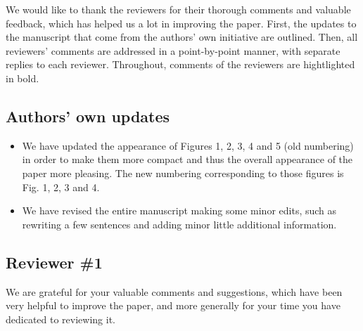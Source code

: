 \documentclass[11pt]{report}
\begin{document}
We would like to thank the reviewers for their thorough comments and valuable feedback, which has helped us a lot in improving the paper. First, the updates to the manuscript that come from the authors' own initiative are outlined. Then, all reviewers' comments are addressed in a point-by-point manner, with separate replies to each reviewer. 
Throughout, comments of the reviewers are hightlighted in bold.

\noindent \hdashrule{12.5cm}{0.2pt}{2mm 1pt}

\subsection*{Authors' own updates}

\begin{itemize}

\item We have updated the appearance of Figures 1, 2, 3, 4 and 5 (old numbering) in order to make them more compact and thus the overall appearance of the paper more pleasing. The new numbering corresponding to those figures is Fig. 1, 2, 3 and 4.

\item We have revised the entire manuscript making some minor edits, such as rewriting a few sentences and adding minor little additional information.

\end{itemize}

\noindent \hdashrule{12.5cm}{0.2pt}{2mm 1pt}

\subsection*{Reviewer \#1}

We are grateful for your valuable comments and suggestions, which have been very helpful to improve the paper, and more generally for your time you have dedicated to reviewing it.
\end{document}
